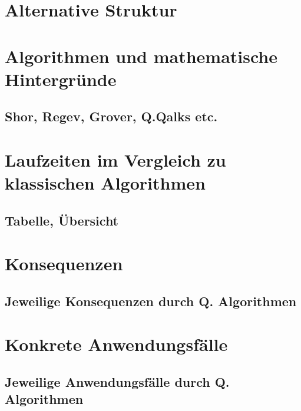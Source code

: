 \section{Alternative Struktur}

\section{Algorithmen und mathematische Hintergründe}

\subsection{Shor, Regev, Grover, Q.Qalks etc.}

\section{Laufzeiten im Vergleich zu klassischen Algorithmen}

\subsection{Tabelle, Übersicht}

\section{Konsequenzen}

\subsection{Jeweilige Konsequenzen durch Q. Algorithmen}

\section{Konkrete Anwendungsfälle}

\subsection{Jeweilige Anwendungsfälle durch Q. Algorithmen}



\printbibliography

